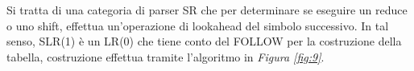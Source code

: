 \documentclass{subfiles}
\begin{document}
Si tratta di una categoria di parser SR che per determinare se eseguire un reduce o uno shift, effettua un'operazione di lookahead del simbolo successivo.
In tal senso, SLR(1) è un LR(0) che tiene conto del FOLLOW per la costruzione della tabella, costruzione effettua tramite l'algoritmo in \emph{Figura \ref{fig:9}}.

\end{document}
